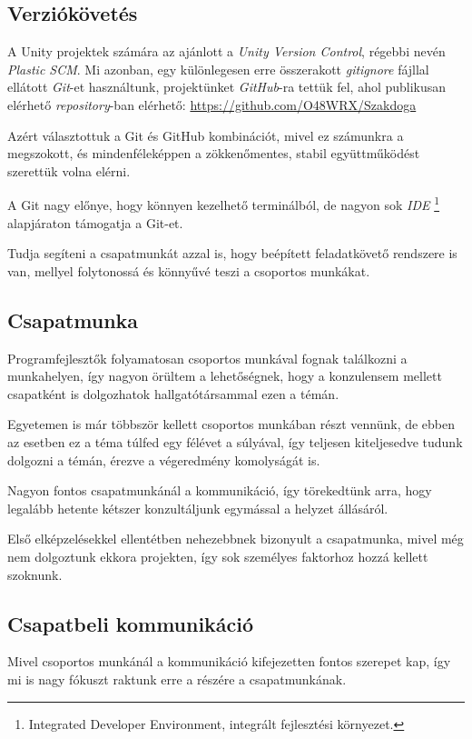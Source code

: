 \documentclass[]{thesis-ekf}
\theoremstyle{definition}
\begin{document}
	\subsection{Verziókövetés}
	A Unity projektek számára az ajánlott a \emph{Unity Version Control}, régebbi nevén \emph{Plastic SCM}. Mi azonban, egy különlegesen erre összerakott \emph{gitignore} fájllal ellátott \emph{Git}-et használtunk, projektünket \emph{GitHub}-ra tettük fel, ahol publikusan elérhető \emph{repository}-ban elérhető:
	\url{https://github.com/O48WRX/Szakdoga}
	
	Azért választottuk a Git és GitHub kombinációt, mivel ez számunkra a megszokott, és mindenféleképpen a zökkenőmentes, stabil együttműködést szerettük volna elérni.
	
	A Git nagy előnye, hogy könnyen kezelhető terminálból, de nagyon sok \emph{IDE} \footnote{Integrated Developer Environment, integrált fejlesztési környezet.} alapjáraton támogatja a Git-et.
	
	Tudja segíteni a csapatmunkát azzal is, hogy beépített feladatkövető rendszere is van, mellyel folytonossá és könnyűvé teszi a csoportos munkákat.
	
	\subsection{Csapatmunka}
	Programfejlesztők folyamatosan csoportos munkával fognak találkozni a munkahelyen, így nagyon örültem a lehetőségnek, hogy a konzulensem mellett csapatként is dolgozhatok hallgatótársammal ezen a témán.
	
	Egyetemen is már többször kellett csoportos munkában részt vennünk, de ebben az esetben ez a téma túlfed egy félévet a súlyával, így teljesen kiteljesedve tudunk dolgozni a témán, érezve a végeredmény komolyságát is.
	
	Nagyon fontos csapatmunkánál a kommunikáció, így törekedtünk arra, hogy legalább hetente kétszer konzultáljunk egymással a helyzet állásáról.
	
	Első elképzelésekkel ellentétben nehezebbnek bizonyult a csapatmunka, mivel még nem dolgoztunk ekkora projekten, így sok személyes faktorhoz hozzá kellett szoknunk.
	
	\pagebreak
	
	\subsection{Csapatbeli kommunikáció}
	Mivel csoportos munkánál a kommunikáció kifejezetten fontos szerepet kap, így mi is nagy fókuszt raktunk erre a részére a csapatmunkának.
	
\end{document}
